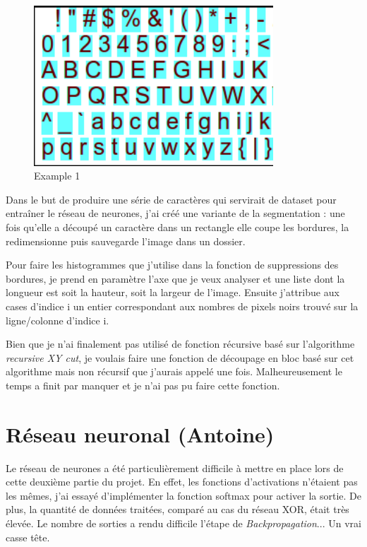 \documentclass[12pt]{report}
\begin{document}
\begin{figure}
    \centering
    \includegraphics[width=0.8\textwidth]{Seg_example_1}
    \caption{Example 1}
\end{figure}

Dans le but de produire une série de caractères qui servirait de dataset pour entraîner le réseau de neurones, j'ai créé une variante de la segmentation : une fois qu'elle a découpé un caractère dans un rectangle elle coupe les bordures, la redimensionne puis sauvegarde l'image dans un dossier.

\newpage

Pour faire les histogrammes que j'utilise dans la fonction de suppressions des bordures, je prend en paramètre l'axe que je veux analyser et une liste dont la longueur est soit la hauteur, soit la largeur de l'image. Ensuite j'attribue aux cases d'indice i un entier correspondant aux nombres de pixels noirs trouvé sur la ligne/colonne d'indice i.

Bien que je n'ai finalement pas utilisé de fonction récursive basé sur l'algorithme \textit{recursive XY cut}, je voulais faire une fonction de découpage en bloc basé sur cet algorithme mais non récursif que j'aurais appelé une fois. Malheureusement le temps a finit par manquer et je n'ai pas pu faire cette fonction.

\section{Réseau neuronal (Antoine)}

Le réseau de neurones a été particulièrement difficile à mettre en place lors de cette deuxième partie du projet. En effet, les fonctions d'activations n'étaient pas les mêmes, j'ai essayé d'implémenter la fonction softmax pour activer la sortie. De plus, la quantité de données traitées, comparé au cas du réseau XOR, était très élevée. Le nombre de sorties a rendu difficile l'étape de \textit{Backpropagation}... Un vrai casse tête.
\end{document}
